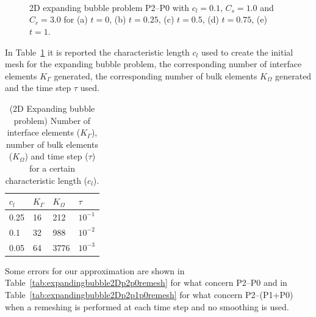 \documentclass[a4paper,12pt,onecolumn]{article}
\begin{document}
\begin{figure}[htbp]
  \centering
  \\
  \quad
  \\
  \quad
  \\
  \caption{2D expanding bubble problem P2--P0 with $c_l=0.1$, $C_s=1.0$ and $C_r=3.0$ for (a) $t=0$, (b) $t=0.25$, (c) $t=0.5$, (d) $t=0.75$, (e) $t=1$.}
  \label{fig:expanding_bubble}
\end{figure}

In Table~\ref{tab:expandingbubble2Delements} it is reported the characteristic length $c_l$ used to create the initial mesh for the expanding bubble problem, the corresponding number of interface elements $K_\Gamma$ generated, the corresponding number of bulk elements $K_\Omega$ generated and the time step $\tau$ used. 
\begin{table}
 \center
\begin{tabular}{llll}
\hline
$c_l$ & $K_\Gamma$ & $K_\Omega$ & $\tau$\\
\hline
0.25 & 16 & 212 & $10^{-1}$ \\
0.1 & 32 & 988 & $10^{-2}$ \\
0.05 & 64 & 3776 & $10^{-3}$ \\
\hline
\end{tabular}
\caption{(2D Expanding bubble problem) Number of interface elements ($K_\Gamma$), number of bulk elements ($K_\Omega$) and time step ($\tau$) for a certain characteristic length ($c_l$).}
\label{tab:expandingbubble2Delements}
\end{table}

Some errors for our approximation are shown in Table~\ref{tab:expandingbubble2Dp2p0remesh} for what concern P2--P0 and in Table~\ref{tab:expandingbubble2Dp2p1p0remesh} for what concern P2--(P1+P0)  when a remeshing is performed at each time step and no smoothing is used.
\end{document}
